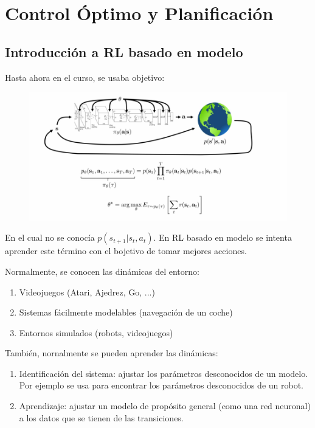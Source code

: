 \chapter{Control Óptimo y Planificación}


\section{Introducción a RL basado en modelo}%
\label{sec:introducción_a_rl_basado_en_modelo}

Hasta ahora en el curso, se usaba objetivo:

\begin{figure}[htpb]
	\centering
	\includegraphics[width=0.8\linewidth]{figures/2020-06-18-112440_942x470_scrot.png}
\end{figure}

En el cual no se conocía $p(s_{t+1}|s_t,a_t)$. En RL basado en modelo se intenta aprender este
término con el bojetivo de tomar mejores acciones.

Normalmente, se conocen las dinámicas del entorno:
 \begin{enumerate}
     \item Videojuegos (Atari, Ajedrez, Go, ...)
     \item Sistemas fácilmente modelables (navegación de un coche)
     \item Entornos simulados (robots, videojuegos)
\end{enumerate}

También, nornalmente se pueden aprender las dinámicas:
\begin{enumerate}
    \item Identificación del sistema: ajustar los parámetros desconocidos de un modelo. Por
        ejemplo se usa para encontrar los parámetros desconocidos de un robot.
    \item Aprendizaje: ajustar un modelo de propósito general (como una red neuronal) a los
        datos que se tienen de las transiciones.
\end{enumerate}

